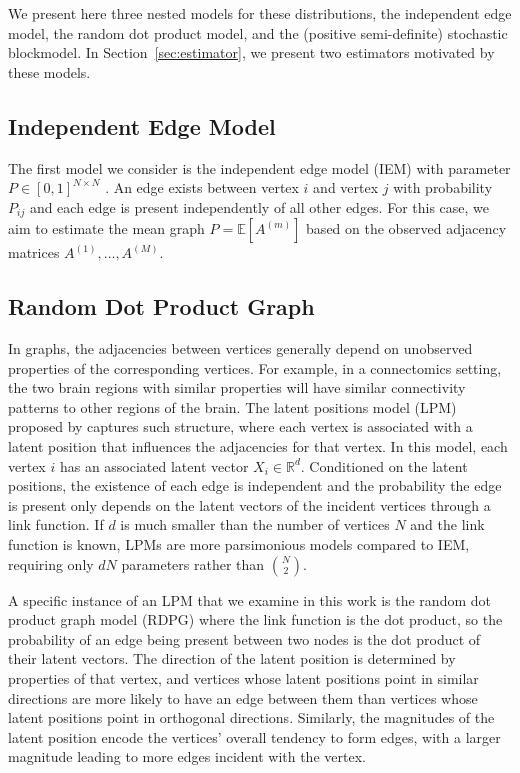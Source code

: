 \documentclass[10pt,letterpaper]{article}
\renewcommand{\Re}{\mathbb{R}}
\newcommand{\Ex}{\mathbb{E}}
\begin{document}
We present here three nested models for these distributions, the independent edge model, the random dot product model, and the (positive semi-definite) stochastic blockmodel.
In Section~\ref{sec:estimator}, we present two estimators motivated by these models.



\subsection{Independent Edge Model}
The first model we consider is the independent edge model (IEM) with parameter $P \in [0,1]^{N\times N}$ \citep{bollobas2007phase}.
An edge exists between vertex $i$ and vertex $j$ with probability $P_{ij}$ and each edge is present independently of all other edges. 
For this case, we aim to estimate the mean graph $P=\Ex[A^{(m)}]$ based on the observed adjacency matrices $A^{(1)},\dotsc,A^{(M)}$.


\subsection{Random Dot Product Graph}
In graphs, the adjacencies between vertices generally depend on unobserved properties of the corresponding vertices. For example, in a connectomics setting, the two brain regions with similar properties will have similar connectivity patterns to other regions of the brain.
The latent positions model (LPM) proposed by \citep{hoff2002latent} captures such structure, where each vertex is associated with a latent position that influences the adjacencies for that vertex.
In this model, each vertex $i$ has an associated latent vector $X_i \in \Re^d$.
Conditioned on the latent positions, the existence of each edge is independent and the probability the edge is present only depends on the latent vectors of the incident vertices through a link function. If $d$ is much smaller than the number of vertices $N$ and the link function is known, LPMs are more parsimonious models compared to IEM, requiring only $dN$ parameters rather than $\binom{N}{2}$.

A specific instance of an LPM that we examine in this work is the random dot product graph model (RDPG) \citep{young2007random, nickel2007random} where the link function is the dot product, so the probability of an edge being present between two nodes is the dot product of their latent vectors.
The direction of the latent position is determined by properties of that vertex, and vertices whose latent positions point in similar directions are more likely to have an edge between them than vertices whose latent positions point in orthogonal directions.
Similarly, the magnitudes of the latent position encode the vertices' overall tendency to form edges, with a larger magnitude leading to more edges incident with the vertex.
\end{document}
